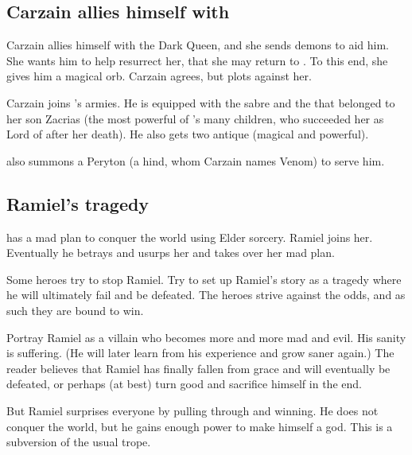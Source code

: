 \subsection{Carzain allies himself with \Belzir} 
Carzain allies himself with the Dark Queen, and she sends demons to aid him. 
She wants him to help resurrect her, that she may return to \Miith{}. 
To this end, she gives him a magical orb. 
Carzain agrees, but plots against her. 

Carzain joins \Belzir's armies. 
He is equipped with the sabre and the  that belonged to her son Zacrias (the most powerful of \Belzir's many children, who succeeded her as Lord of \ClanGeican after her death). 
He also gets two antique  (magical and powerful). 

\Belzir{} also summons a Peryton (a hind, whom Carzain names Venom) to serve him. 








\subsection{Ramiel's tragedy} 
\Belzir has a mad plan to conquer the world using Elder sorcery.
Ramiel joins her. 
Eventually he betrays and usurps her and takes over her mad plan. 

Some heroes try to stop Ramiel.
Try to set up Ramiel's story as a tragedy where he will ultimately fail and be defeated.
The heroes strive against the odds, and as such they are bound to win. 

Portray Ramiel as a villain who becomes more and more mad and evil. 
His sanity is suffering. 
(He will later learn from his experience and grow saner again.) 
The reader believes that Ramiel has finally fallen from grace and will eventually be defeated, or perhaps (at best) turn good and sacrifice himself in the end. 

But Ramiel surprises everyone by pulling through and winning. 
He does not conquer the world, but he gains enough power to make himself a god. 
This is a subversion of the usual  trope. 

